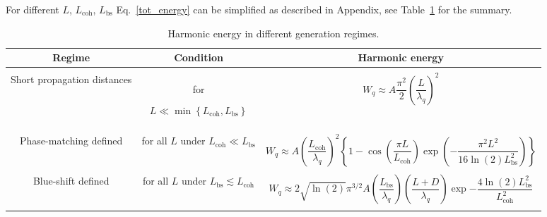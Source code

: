 For different $L$, $L_\mathrm{coh}$, $L_\mathrm{bs}$ Eq.~\eqref{tot_energy} can be simplified as described in Appendix, see Table~\ref{tab:harm_energy_limits} for the summary.
\begin{table}[h!]
\newlength{\equationlengthtableone}
\setlength{\equationlengthtableone}{9.5cm}
\renewcommand\thetable{1}
\centering
\begin{tabular}{| c | c | c |}
\hline
Regime & Condition & Harmonic energy \\ 
\hline
&&\\
Short propagation distances
& for
\begin{minipage}{3.5cm}
\begin{equation}
 L\ll \min \left\{L_\mathrm{coh}, L_\mathrm{bs} \right\}
\label{condition0}   
\end{equation} 
\end{minipage}
&
\begin{minipage}{\equationlengthtableone}
\begin{equation}
W_q \approx 
A \frac{\pi^2}{2} \left( \frac{L}{\lambda_q}\right)^2
\label{main_tot_energy_short_L1}
\end{equation} 
\end{minipage}
%
\\
&&\\

Phase-matching defined
&
for all $L$ under $L_\mathrm{coh} \ll L_\mathrm{bs}$ 
& 
\begin{minipage}{\equationlengthtableone}
\begin{equation}
W_q \approx A  \left( \frac{L_\mathrm{coh}}{\lambda_q}\right)^2
\left\{ 1 - \cos\left(\frac{\pi L}{L_\mathrm{coh}}\right) \exp\left( - \frac{\pi^2 L^2}{16\ln(2) L_\mathrm{bs}^2}\right) \right\} 
\label{main_tot_energy_long_L2}
\end{equation}
\end{minipage}
%
\\ 
&&\\

Blue-shift defined
&
for all $L$ under $L_\mathrm{bs} \lesssim L_\mathrm{coh}$ 
&
\begin{minipage}{\equationlengthtableone}
\begin{equation}
W_q \approx  2 \sqrt{\ln(2)} \pi^{3/2} A\left( \frac{L_\mathrm{bs}}{\lambda_q}\right) \left( \frac{L+D}{\lambda_q}\right) \exp{-\frac{4 \ln(2) L_\mathrm{bs}^2}{L_\mathrm{coh}^2}}
\label{main_tot_energy_long_L5}
\end{equation}
\end{minipage}
\\
&&\\
\hline
\end{tabular}
\caption{Harmonic energy in different generation regimes.}
\label{tab:harm_energy_limits}
\end{table}

